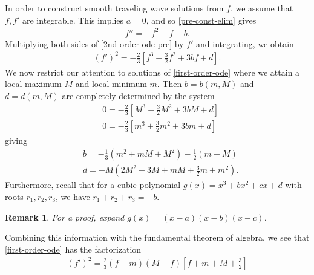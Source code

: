 \documentclass[12pt,reqno]{amsart}
\numberwithin{equation}{section}  %
\newtheorem{remark}[theorem]{Remark}
\begin{document}
%
%
In order to construct smooth traveling wave solutions from $f$, we assume that
$f, f'$ are integrable. This implies $a =0$, and so  
 \eqref{pre-const-elim} gives
%
\begin{equation}
  \label{2nd-order-ode-pre}
\begin{split}
  f'' = - f^{2} -f -b.
\end{split}
\end{equation}
%
%
Multiplying both sides of \eqref{2nd-order-ode-pre} by $f'$ and integrating,  we obtain 
%
\begin{equation}
  \label{first-order-ode}
\begin{split}
  (f')^{2} = -\frac{2}{3} \left [ f^{3} + \frac{3}{2}f^{2} + 3bf +d
  \right ].
\end{split}
\end{equation}
%
%
We now restrict our attention to solutions of \eqref{first-order-ode} where
we attain a local maximum $M$ and local minimum $m$. Then $b = b(m, M)$ and $d =
d(m, M)$ are 
completely determined by the system
%
%
\begin{equation*}
\begin{split}
  & 0 = -\frac{2}{3} \left [ M^{3} + \frac{3}{2} M^{2} + 3bM + d
  \right ]
  \\
  & 0 = -\frac{2}{3} \left [ m^{3} + \frac{3}{2} m^{2} + 3bm + d
  \right ]
\end{split}
\end{equation*}
%
giving
%
%
\begin{equation}
  \label{b-val}
\begin{split}
  & b  = -\frac{1}{3}\left( m^{2} + mM + M^{2} \right) - \frac{1}{2}\left( m + M
  \right)
  \\
  & d = -M\left( 2M^{2} + 3M + mM + \frac{3}{2}m + m^{2} \right).
\end{split}
\end{equation}
%
%
%
Furthermore, recall that for a cubic polynomial $g(x) = x^{3} +bx^{2} +cx +d$
with roots $r_{1}, r_{2}, r_{3}$, we have $r_{1} + r_{2} + r_{3} = -b$.
%
%
\begin{framed}
%
%
\begin{remark}
\label{rem:fact-pf}
For a proof, expand 
$g(x) = (x-a)(x-b)(x-c)$.
\end{remark}
%
%
\end{framed}
%
%
Combining this information with the fundamental theorem of algebra, 
we see that \eqref{first-order-ode} has the factorization
%
%
%
%
\begin{equation}
\begin{split}
  \left ( f'\right )^{2}
  = \frac{2}{3} \left (f-m\right )
  \left( M-f\right )
  \left [ f + m + M + \frac{3}{2} \right ]
\end{split}
\label{ode-fact}
\end{equation}
\end{document}
